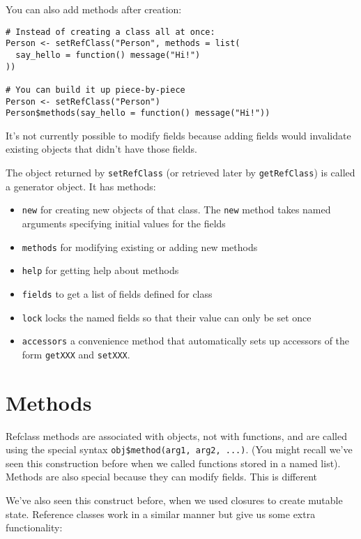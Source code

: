 You can also add methods after creation:

\begin{verbatim}
# Instead of creating a class all at once:
Person <- setRefClass("Person", methods = list(
  say_hello = function() message("Hi!")
))

# You can build it up piece-by-piece
Person <- setRefClass("Person")
Person$methods(say_hello = function() message("Hi!"))
\end{verbatim}

It's not currently possible to modify fields because adding fields would
invalidate existing objects that didn't have those fields.

The object returned by \texttt{setRefClass} (or retrieved later by
\texttt{getRefClass}) is called a generator object. It has methods:

\begin{itemize}
\item
  \texttt{new} for creating new objects of that class. The \texttt{new}
  method takes named arguments specifying initial values for the fields
\item
  \texttt{methods} for modifying existing or adding new methods
\item
  \texttt{help} for getting help about methods
\item
  \texttt{fields} to get a list of fields defined for class
\item
  \texttt{lock} locks the named fields so that their value can only be
  set once
\item
  \texttt{accessors} a convenience method that automatically sets up
  accessors of the form \texttt{getXXX} and \texttt{setXXX}.
\end{itemize}

\section{Methods}

Refclass methods are associated with objects, not with functions, and
are called using the special syntax
\texttt{obj\$method(arg1, arg2, ...)}. (You might recall we've seen this
construction before when we called functions stored in a named list).
Methods are also special because they can modify fields. This is
different

We've also seen this construct before, when we used closures to create
mutable state. Reference classes work in a similar manner but give us
some extra functionality:


